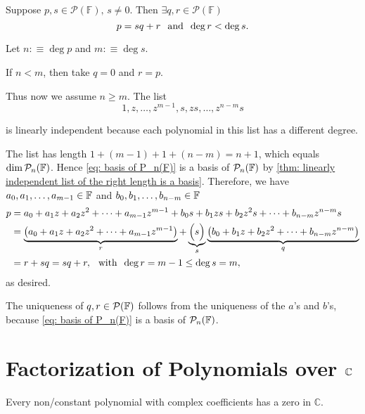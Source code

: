 \setcounter{thm}{8}
\begin{thm}
  \label{division-algorithm-for-polynomials}
  Suppose $p,s \in \mathcal{P} (\mathbb{F}), \, s\neq 0$.
  Then $\exists q,r \in \mathcal{P} (\mathbb{F})$ \st
  \begin{equation}
    p=sq+r \;\;\, \text{and}\;\; \deg r < \deg s.
  \end{equation}
\end{thm}
\begin{prf}
  Let $n:\equiv \deg p$ and $m:\equiv \deg s$.

  If $n<m$, then take $q=0$ and $r=p$.

  Thus now we assume $n \geq m$. The list
  \begin{equation}
    \label{eq: basis of P_n(F)}
    1, z, \ldots, z^{m-1}, s, zs, \ldots, z^{n-m}s
  \end{equation}

  is linearly independent because each polynomial in this list has a different degree.

  The list has length $1+(m-1)+1+(n-m)=n+1$, which equals $\dim \mathcal{P}_n(\mathbb{F})$. Hence \eqref{eq: basis of P_n(F)} is a basis of $\mathcal{P}_n(\mathbb{F})$ by \ref{thm: linearly independent list of the right length is a basis}. Therefore, we have $a_0, a_1, \ldots, a_{m-1} \in \mathbb{F}$ and $b_0, b_1, \ldots, b_{n-m} \in \mathbb{F}$  \st
  \begin{equation}
    \begin{aligned}
          p&=a_0 + a_1z + a_2z^2 + \cdots + a_{m-1} z^{m-1}
          + b_0 s + b_1 zs + b_2 z^2 s + \cdots + b_{n-m}z^{n-m}s \\
           &=\underbrace{\left(a_0 + a_1z + a_2z^2 + \cdots + a_{m-1} z^{m-1} \right)}_{r} + \underbrace{\Big(s\Big)}_{s} \underbrace{\left( b_0 + b_1 z + b_2 z^2 + \cdots + b_{n-m} z^{n-m} \right)}_{q} \\
           &=r+sq=sq+r, \;\;\, \text{with}\;\; \deg r = m-1 \leq \deg s = m,
    \end{aligned}
  \end{equation}
  as desired.

  The uniqueness of $q,r \in \mathcal{P}(\mathbb{F})$ follows from the uniqueness of the $a$'s and $b$'s, because \eqref{eq: basis of P_n(F)} is a basis of $\mathcal{P}_n(\mathbb{F})$.
\end{prf}
\section{Factorization of Polynomials over \texorpdfstring{$\mathbb{C}$}{C}}
\setcounter{thm}{11}
\begin{thm}
  \label{fundamental-theorem-of-algebra-first-version}
  Every non\-/constant polynomial with complex coefficients has a zero in $\mathbb{C}$.
\end{thm}

